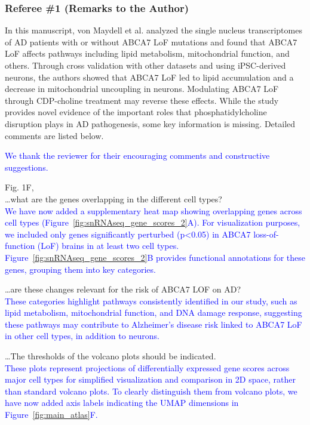 \subsubsection*{Referee \#1 (Remarks to the Author)}
In this manuscript, von Maydell et al. analyzed the single nucleus transcriptomes of AD patients with or without ABCA7 LoF mutations and found that ABCA7 LoF affects pathways including lipid metabolism, mitochondrial function, and others. Through cross validation with other datasets and using iPSC-derived neurons, the authors showed that ABCA7 LoF led to lipid accumulation and a decrease in mitochondrial uncoupling in neurons. Modulating ABCA7 LoF through CDP-choline treatment may reverse these effects.
While the study provides novel evidence of the important roles that phosphatidylcholine disruption plays in AD pathogenesis, some key information is missing. Detailed comments are listed below.

\textcolor{blue}{We thank the reviewer for their encouraging comments and constructive suggestions.}

Fig. 1F,\\
\dots what are the genes overlapping in the different cell types?\\ 
\textcolor{blue}{ We have now added a supplementary heat map showing overlapping genes across cell types (Figure~\ref{fig:snRNAseq_gene_scores_2}A). For visualization purposes, we included only genes significantly perturbed (p<0.05) in ABCA7 loss-of-function (LoF) brains in at least two cell types. Figure~\ref{fig:snRNAseq_gene_scores_2}B provides functional annotations for these genes, grouping them into key categories.}

\dots are these changes relevant for the risk of ABCA7 LOF on AD?\\ 
\textcolor{blue}{These categories highlight pathways consistently identified in our study, such as lipid metabolism, mitochondrial function, and DNA damage response, suggesting these pathways may contribute to Alzheimer’s disease risk linked to ABCA7 LoF in other cell types, in addition to neurons.}

\dots The thresholds of the volcano plots should be indicated.\\ 
\textcolor{blue}{These plots represent projections of differentially expressed gene scores across major cell types for simplified visualization and comparison in 2D space, rather than standard volcano plots. To clearly distinguish them from volcano plots, we have now added axis labels indicating the UMAP dimensions in Figure~\ref{fig:main_atlas}F.}

